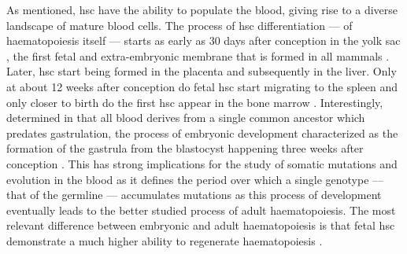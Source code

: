 As mentioned, \ac{hsc} have the ability to populate the blood, giving rise to a diverse landscape of mature blood cells. The process of \ac{hsc} differentiation --- of haematopoiesis itself --- starts as early as 30 days after conception in the yolk sac \cite{Rieger2012-bh}, the first fetal and extra-embryonic membrane that is formed in all mammals \cite{Dong2018-se}. Later, \ac{hsc} start being formed in the placenta and subsequently in the liver. Only at about 12 weeks after conception do fetal \ac{hsc} start migrating to the spleen and only closer to birth do the first \ac{hsc} appear in the bone marrow \cite{Rieger2012-bh}. Interestingly,  determined in \cite{Lee-Six2018-lp} that all blood derives from a single common ancestor which predates gastrulation, the process of embryonic development characterized as the formation of the gastrula from the blastocyst happening three weeks after conception \cite{Muhr2020-ep}. This has strong implications for the study of somatic mutations and evolution in the blood as it defines the period over which a single genotype --- that of the germline --- accumulates mutations as this process of development eventually leads to the better studied process of adult haematopoiesis. The most relevant difference between embryonic and adult haematopoiesis is that fetal \ac{hsc} demonstrate a much higher ability to regenerate haematopoiesis \cite{Becker1965-xg,Holyoake1999-nz,Nicolini1999-xe}.

